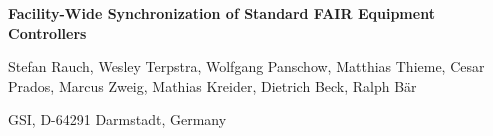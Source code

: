 \documentclass[25pt,halfparskip-,pagesize]{scrartcl}
\begin{document}
\vspace*{1ex}

{\centering
\begin{minipage}{20in}
\centering \sffamily\Huge \rule{0pt}{50pt}\textbf{Facility-Wide Synchronization of Standard FAIR Equipment Controllers}\par
\vspace{5mm} \LARGE Stefan Rauch,
Wesley Terpstra,
Wolfgang Panschow,
Matthias Thieme,
Cesar Prados,
Marcus Zweig,
Mathias Kreider,
Dietrich Beck,
Ralph B\"ar
\par
\vspace{5mm}
\Large GSI, D-64291 Darmstadt, Germany
\rule[-12pt]{0pt}{10pt}\par
\end{minipage}%
\par}%
\end{document}
